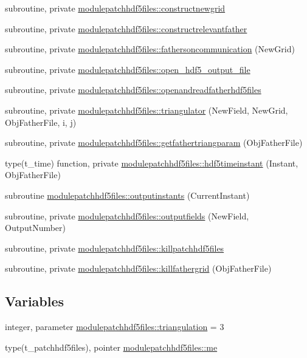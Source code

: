 \begin{DoxyCompactItemize}
subroutine, private \mbox{\hyperlink{namespacemodulepatchhdf5files_a0119a40208d98a8f1111fd3b51740428}{modulepatchhdf5files\+::constructnewgrid}}
\item 
subroutine, private \mbox{\hyperlink{namespacemodulepatchhdf5files_a737940e59c6035bed94366c5f2116a1b}{modulepatchhdf5files\+::constructrelevantfather}}
\item 
subroutine, private \mbox{\hyperlink{namespacemodulepatchhdf5files_aa9e9da877fcc2414ea0022fe33fa09e9}{modulepatchhdf5files\+::fathersoncommunication}} (New\+Grid)
\item 
subroutine, private \mbox{\hyperlink{namespacemodulepatchhdf5files_ad3c3d3284e4aaad5b2b6c70612fbc40b}{modulepatchhdf5files\+::open\+\_\+hdf5\+\_\+output\+\_\+file}}
\item 
subroutine, private \mbox{\hyperlink{namespacemodulepatchhdf5files_aa13f313e5bea3ff364240319fb791f70}{modulepatchhdf5files\+::openandreadfatherhdf5files}}
\item 
subroutine, private \mbox{\hyperlink{namespacemodulepatchhdf5files_a5d3c460838e5e6b1caa6735da5973943}{modulepatchhdf5files\+::triangulator}} (New\+Field, New\+Grid, Obj\+Father\+File, i, j)
\item 
subroutine, private \mbox{\hyperlink{namespacemodulepatchhdf5files_ae089f4cffb7f9cab00153e6819836597}{modulepatchhdf5files\+::getfathertriangparam}} (Obj\+Father\+File)
\item 
type(t\+\_\+time) function, private \mbox{\hyperlink{namespacemodulepatchhdf5files_ae7939a4a353ce44a104d18abfe71c0ef}{modulepatchhdf5files\+::hdf5timeinstant}} (Instant, Obj\+Father\+File)
\item 
subroutine \mbox{\hyperlink{namespacemodulepatchhdf5files_a5a84e7c89a2de8e50674a804e7e307b0}{modulepatchhdf5files\+::outputinstants}} (Current\+Instant)
\item 
subroutine, private \mbox{\hyperlink{namespacemodulepatchhdf5files_a32322a9b20e258cf772b50096c520369}{modulepatchhdf5files\+::outputfields}} (New\+Field, Output\+Number)
\item 
subroutine, private \mbox{\hyperlink{namespacemodulepatchhdf5files_a28038c83fc0a33bceb0c35f3e9ba08af}{modulepatchhdf5files\+::killpatchhdf5files}}
\item 
subroutine, private \mbox{\hyperlink{namespacemodulepatchhdf5files_a9cdefa24170268bd385859fedc04a136}{modulepatchhdf5files\+::killfathergrid}} (Obj\+Father\+File)
\end{DoxyCompactItemize}
\subsection*{Variables}
\begin{DoxyCompactItemize}
\item 
integer, parameter \mbox{\hyperlink{namespacemodulepatchhdf5files_a439d7df47b711c777dcf57041c223f85}{modulepatchhdf5files\+::triangulation}} = 3
\item 
type(t\+\_\+patchhdf5files), pointer \mbox{\hyperlink{namespacemodulepatchhdf5files_a95897e5f337f1d8ca5daa5b7a5d9654e}{modulepatchhdf5files\+::me}}
\end{DoxyCompactItemize}
